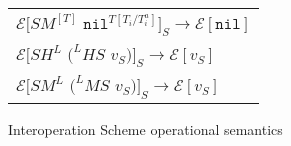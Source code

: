 \begin{figure}[p]
\begin{tabular}{l}
$\mathscr{E}[SM^{[T]}$ $\mathtt{nil}^{T[T_{i}/T_{i}^{a}]}]_{S}\rightarrow\mathscr{E}[\mathtt{nil}]$ \\

\vspace{5pt}

$\mathscr{E}[SH^{L}$ $(^{L}HS$ $v_{S})]_{S}\rightarrow\mathscr{E}[v_{S}]$ \\

\vspace{5pt}

$\mathscr{E}[SM^{L}$ $(^{L}MS$ $v_{S})]_{S}\rightarrow\mathscr{E}[v_{S}]$
\end{tabular}
\caption{Interoperation Scheme operational semantics}
\label{isos}
\end{figure}
